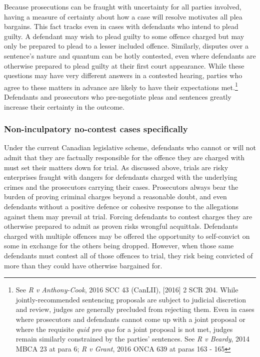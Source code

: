 Because prosecutions can be fraught with uncertainty for all parties involved, having a measure of certainty about how a case will resolve motivates all plea bargains. This fact tracks even in cases with defendants who intend to plead guilty. A defendant may wish to plead guilty to some offence charged but may only be prepared to plead to a lesser included offence. Similarly, disputes over a sentence's nature and quantum can be hotly contested, even where defendants are otherwise prepared to plead guilty at their first court appearance. While these questions may have very different answers in a contested hearing, parties who agree to these matters in advance are likely to have their expectations met.\footnote{See \textit{R v Anthony-Cook}, 2016 SCC 43 (CanLII), [2016] 2 SCR 204. While jointly-recommended sentencing proposals are subject to judicial discretion and review, judges are generally precluded from rejecting them. Even in cases where prosecutors and defendants cannot come up with a joint proposal or where the requisite \textit{quid pro quo} for a joint proposal is not met, judges remain similarly constrained by the parties' sentences. See \textit{R v Beardy}, 2014 MBCA 23 at para 6; \textit{R v Grant}, 2016 ONCA 639 at paras 163 - 165} Defendants and prosecutors who pre-negotiate pleas and sentences greatly increase their certainty in the outcome.

\subsubsection{Non-inculpatory no-contest cases specifically}

Under the current Canadian legislative scheme, defendants who cannot or will not admit that they are factually responsible for the offence they are charged with must set their matters down for trial. As discussed above, trials are risky enterprises fraught with dangers for defendants charged with the underlying crimes and the prosecutors carrying their cases. Prosecutors always bear the burden of proving criminal charges beyond a reasonable doubt, and even defendants without a positive defence or cohesive response to the allegations against them may prevail at trial. Forcing defendants to contest charges they are otherwise prepared to admit as proven risks wrongful acquittals. Defendants charged with multiple offences may be offered the opportunity to self-convict on some in exchange for the others being dropped. However, when those same defendants must contest all of those offences to trial, they risk being convicted of more than they could have otherwise bargained for.

